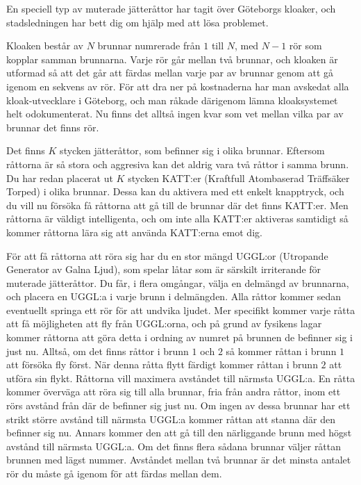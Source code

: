 \noindent
En speciell typ av muterade jätteråttor har tagit över Göteborgs kloaker,
och stadsledningen har bett dig om hjälp med att lösa problemet.

Kloaken består av $N$ brunnar numrerade från $1$ till $N$, med $N-1$ rör som kopplar samman brunnarna.
Varje rör går mellan två brunnar, och kloaken är utformad
så att det går att färdas mellan varje par av brunnar genom att gå igenom en sekvens av rör.
För att dra ner på kostnaderna har man avskedat alla kloak-utvecklare i Göteborg, 
och man råkade därigenom lämna kloaksystemet helt odokumenterat.
Nu finns det alltså ingen kvar som vet mellan vilka par av brunnar det finns rör.

Det finns $K$ stycken jätteråttor, som befinner sig i olika brunnar.
Eftersom råttorna är så stora och aggresiva kan det aldrig vara två råttor i samma brunn.
Du har redan placerat ut $K$ stycken KATT:er (Kraftfull Atombaserad Träffsäker Torped) i olika brunnar.
Dessa kan du aktivera med ett enkelt knapptryck,
och du vill nu försöka få råttorna att gå till de brunnar där det finns KATT:er.
Men råttorna är väldigt intelligenta, och om inte alla KATT:er aktiveras samtidigt så kommer råttorna
lära sig att använda KATT:erna emot dig.

För att få råttorna att röra sig har du en stor mängd UGGL:or 
(Utropande Generator av Galna Ljud),
som spelar låtar som är särskilt irriterande för muterade jätteråttor.
Du får, i flera omgångar, välja en delmängd av brunnarna, och placera en UGGL:a i varje brunn i delmängden.
Alla råttor kommer sedan eventuellt springa ett rör för att undvika ljudet.
Mer specifikt kommer varje råtta att få möjligheten att fly från UGGL:orna,
och på grund av fysikens lagar kommer råttorna att göra detta i ordning av numret på brunnen de befinner sig i just nu.
Alltså, om det finns råttor i brunn $1$ och $2$ så kommer råttan i brunn $1$ att försöka fly först.
När denna råtta flytt färdigt kommer råttan i brunn $2$ att utföra sin flykt.
Råttorna vill maximera avståndet till närmsta UGGL:a.
En råtta kommer överväga att röra sig till alla brunnar, fria från andra råttor, 
inom ett rörs avstånd från där de befinner sig just nu.
Om ingen av dessa brunnar har ett strikt större avstånd till närmsta UGGL:a kommer råttan att stanna där den befinner sig nu. 
Annars kommer den att gå till den närliggande brunn med högst avstånd till närmsta UGGL:a.
Om det finns flera sådana brunnar väljer råttan brunnen med lägst nummer.
Avståndet mellan två brunnar är det minsta antalet rör du måste gå igenom för att färdas mellan dem.

